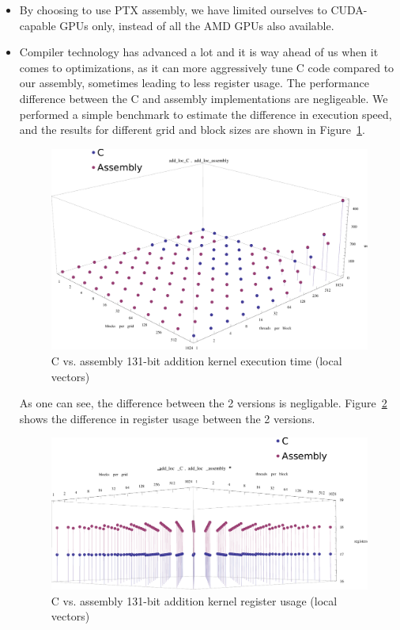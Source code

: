 \documentclass[12pt, a4paper]{report}
\begin{document}
\begin{itemize}
\item By choosing to use PTX assembly, we have limited ourselves to CUDA-capable
GPUs only, instead of all the AMD GPUs also available.
\item Compiler technology has advanced a lot and it is way ahead of us when it
comes to optimizations, as it can more aggressively tune C code compared to
our assembly, sometimes leading to less register usage.
The performance difference between the C and assembly implementations are
negligeable.
We performed a simple benchmark to estimate the difference in execution speed,
and the results for different grid and block sizes are shown in
Figure~\ref{fig:assembly_vs_c_loc_kepler_131_duration}.

\begin{figure}[h]
\centering
\includegraphics[scale=0.4]{figs/assembly_vs_c_loc_kepler_131_duration}
\caption{C vs. assembly 131-bit addition kernel execution time (local vectors)}
\label{fig:assembly_vs_c_loc_kepler_131_duration}
\end{figure}

As one can see, the difference between the 2 versions is negligable.
Figure~\ref{fig:assembly_vs_c_loc_kepler_131_registers} shows the difference in
register usage between the 2 versions.

\begin{figure}[h]
\centering
\includegraphics[scale=0.4]{figs/assembly_vs_c_loc_kepler_131_registers}
\caption{C vs. assembly 131-bit addition kernel register usage (local vectors)}
\label{fig:assembly_vs_c_loc_kepler_131_registers}
\end{figure}


\end{itemize}
\end{document}
